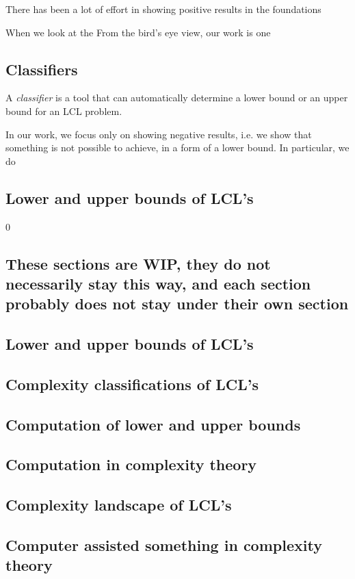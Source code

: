 There has been a lot of effort in showing positive results in the foundations


When we look at the 
From the bird's eye view, our work is one 

\subsection{Classifiers}

A \emph{classifier} is a tool that can automatically determine a lower bound or an upper bound for an LCL problem.

In our work, we focus only on showing negative results, i.e. we show that something is not possible to achieve, in a form of a lower bound.
In particular, we do


\subsection{Lower and upper bounds of LCL's}


0

\subsection{\color{red}These sections are WIP, they do not necessarily stay this way, and each section probably does not stay under their own section}
\subsection{Lower and upper bounds of LCL's}
\subsection{Complexity classifications of LCL's}
\subsection{Computation of lower and upper bounds}
\subsection{Computation in complexity theory}
\subsection{Complexity landscape of LCL's}
\subsection{Computer assisted something in complexity theory}
